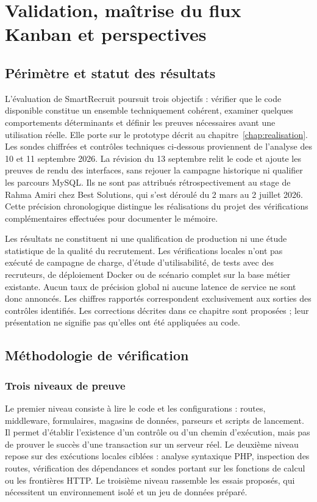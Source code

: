 \chapter{Validation, maîtrise du flux Kanban et perspectives}
\label{chap:validation}

\section{Périmètre et statut des résultats}

L'évaluation de SmartRecruit poursuit trois objectifs : vérifier que le code disponible constitue un ensemble techniquement cohérent, examiner quelques comportements déterminants et définir les preuves nécessaires avant une utilisation réelle. Elle porte sur le prototype décrit au chapitre~\ref{chap:realisation}. Les sondes chiffrées et contrôles techniques ci-dessous proviennent de l'analyse des 10 et 11 septembre 2026. La révision du 13 septembre relit le code et ajoute les preuves de rendu des interfaces, sans rejouer la campagne historique ni qualifier les parcours MySQL. Ils ne sont pas attribués rétrospectivement au stage de Rahma Amiri chez Best Solutions, qui s'est déroulé du 2 mars au 2 juillet 2026. Cette précision chronologique distingue les réalisations du projet des vérifications complémentaires effectuées pour documenter le mémoire.

Les résultats ne constituent ni une qualification de production ni une étude statistique de la qualité du recrutement. Les vérifications locales n'ont pas exécuté de campagne de charge, d'étude d'utilisabilité, de tests avec des recruteurs, de déploiement Docker ou de scénario complet sur la base métier existante. Aucun taux de précision global ni aucune latence de service ne sont donc annoncés. Les chiffres rapportés correspondent exclusivement aux sorties des contrôles identifiés. Les corrections décrites dans ce chapitre sont proposées ; leur présentation ne signifie pas qu'elles ont été appliquées au code.

\section{Méthodologie de vérification}

\subsection{Trois niveaux de preuve}

Le premier niveau consiste à lire le code et les configurations : routes, middleware, formulaires, magasins de données, parseurs et scripts de lancement. Il permet d'établir l'existence d'un contrôle ou d'un chemin d'exécution, mais pas de prouver le succès d'une transaction sur un serveur réel. Le deuxième niveau repose sur des exécutions locales ciblées : analyse syntaxique PHP, inspection des routes, vérification des dépendances et sondes portant sur les fonctions de calcul ou les frontières HTTP. Le troisième niveau rassemble les essais proposés, qui nécessitent un environnement isolé et un jeu de données préparé.

